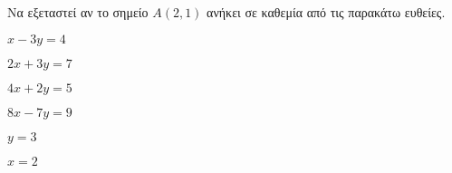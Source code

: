 Να εξεταστεί αν το σημείο $ A(2,1) $ ανήκει σε καθεμία από τις παρακάτω ευθείες.
\begin{multicols}{2}
\begin{rlist}[leftmargin=5mm]
\item $ x-3y=4 $
\item $ 2x+3y=7 $
\item $ 4x+2y=5 $
\item $ 8x-7y=9 $
\item $ y=3 $
\item $ x=2 $
\end{rlist}
\end{multicols}
